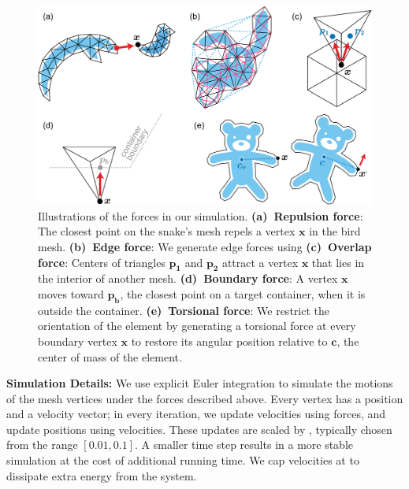 \begin{figure}
\centering
\includegraphics[width=1.0\textwidth]{figures/repulsionpak/all_forces_new.pdf}
\caption[Illustrations of the forces in a RepulsionPak simulation]{
\label{fig_forces}
Illustrations of the forces in our simulation.
\;\textbf{(a)~Repulsion force}:
The closest point on the snake's mesh
repels a vertex $\bm{x}$ in the bird mesh.
\textbf{(b)~Edge force}: 
We generate edge forces using
\textbf{(c)~Overlap force}: 
Centers of triangles $\bm{p_1}$ and $\bm{p_2}$ attract a vertex
$\bm{x}$ that lies in the interior of another mesh.
\;\textbf{(d)~Boundary force}: A vertex $\bm{x}$ moves toward $\bm{p_b}$,
the closest point on a target container, when it is outside the container.
\textbf{(e)~Torsional force}: We restrict the orientation of the element by generating 
a torsional force at every boundary vertex $\bm{x}$
to restore its angular position relative to $\bm{c}$, 
the center of mass of the element.
}
\end{figure}


\medskip
\textbf{Simulation Details:} 
We use explicit Euler integration to simulate the motions of the mesh vertices under the
forces described above.  Every vertex has a position and a velocity vector; in
every iteration, we update velocities using forces, and update positions using
velocities.  These updates are scaled by , typically
chosen from the range $[0.01,0.1]$.  A smaller time step results in a more
stable simulation at the cost of additional running time.  We cap velocities
at  to dissipate extra energy from the system.

